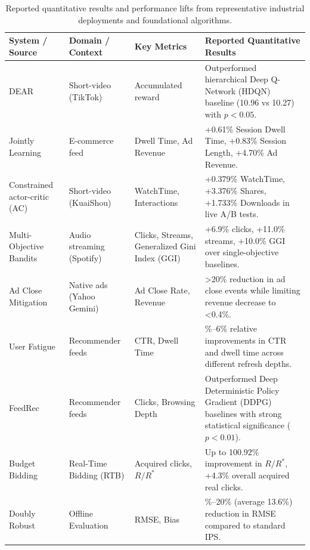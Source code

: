 \documentclass[manuscript,review,screen]{acmart}
\begin{document}
\begin{table}[ht]
\centering
\footnotesize
\renewcommand{\arraystretch}{1.15}
\setlength{\tabcolsep}{3pt}
\begin{tabularx}{\textwidth}{>{\raggedright\arraybackslash}p{} >{\raggedright\arraybackslash}p{} >{\raggedright\arraybackslash}p{} >{\raggedright\arraybackslash}X}
\toprule
\textbf{System / Source} & \textbf{Domain / Context} & \textbf{Key Metrics} & \textbf{Reported Quantitative Results} \\
\midrule
DEAR \cite{zhao2021dear} & Short-video (TikTok) & Accumulated reward & Outperformed hierarchical Deep Q-Network (HDQN) baseline (10.96 vs 10.27) with $p < 0.05$. \\
\midrule
Jointly Learning \cite{zhao2020jointly} & E-commerce feed & Dwell Time, Ad Revenue & +0.61\% Session Dwell Time, +0.83\% Session Length, +4.70\% Ad Revenue. \\
\midrule
Constrained actor-critic (AC) \cite{cai2023two} & Short-video (KuaiShou) & WatchTime, Interactions & +0.379\% WatchTime, +3.376\% Shares, +1.733\% Downloads in live A/B tests. \\
\midrule
Multi-Objective Bandits \cite{Mehrotra2020} & Audio streaming (Spotify) & Clicks, Streams, Generalized Gini Index (GGI) & +6.9\% clicks, +11.0\% streams, +10.0\% GGI over single-objective baselines. \\
\midrule
Ad Close Mitigation \cite{silberstein2020ad} & Native ads (Yahoo Gemini) & Ad Close Rate, Revenue & >20\% reduction in ad close events while limiting revenue decrease to <0.4\%. \\
\midrule
User Fatigue \cite{sagtani2023quantifying} & Recommender feeds & CTR, Dwell Time & 2\%--6\% relative improvements in CTR and dwell time across different refresh depths. \\
\midrule
FeedRec \cite{zou2019reinforcement} & Recommender feeds & Clicks, Browsing Depth & Outperformed Deep Deterministic Policy Gradient (DDPG) baselines with strong statistical significance ($p < 0.01$). \\
\midrule
Budget Bidding \cite{wu2018budget} & Real-Time Bidding (RTB) & Acquired clicks, $R/R^*$ & Up to 100.92\% improvement in $R/R^*$, +4.3\% overall acquired real clicks. \\
\midrule
Doubly Robust \cite{dudik2011doubly} & Offline Evaluation & RMSE, Bias & 10\%--20\% (average 13.6\%) reduction in RMSE compared to standard IPS. \\
\bottomrule
\end{tabularx}
\caption{Reported quantitative results and performance lifts from representative industrial deployments and foundational algorithms.}
\label{tab:quantitative-results}
\end{table}
\end{document}
